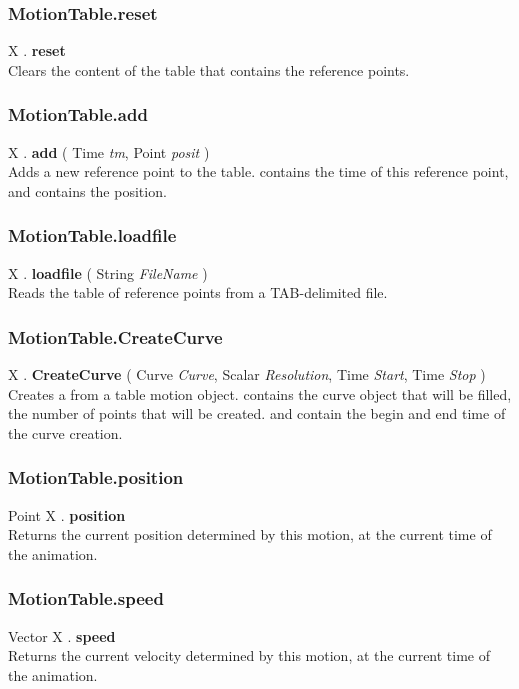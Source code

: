 \subsubsection{MotionTable.reset \label{F:MotionTable:reset}}
X . \textbf{reset} \\
Clears the content of the table that contains the reference points.

\subsubsection{MotionTable.add \label{F:MotionTable:add}}
X . \textbf{add} ( Time \textit{tm}, Point \textit{posit} ) \\
Adds a new reference point to the table.  contains the time of this reference point, and  contains the position.

\subsubsection{MotionTable.loadfile \label{F:MotionTable:loadfile}}
X . \textbf{loadfile} ( String \textit{FileName} ) \\
Reads the table of reference points from a TAB-delimited file.

\subsubsection{MotionTable.CreateCurve \label{F:MotionTable:CreateCurve}}
X . \textbf{CreateCurve} ( Curve \textit{Curve}, Scalar \textit{Resolution}, Time \textit{Start}, Time \textit{Stop} ) \\
Creates a  from a table motion object.  contains the curve object that will be filled,  the number of points that will be created.  and  contain the begin and end time of the curve creation.

\subsubsection{MotionTable.position \label{F:MotionTable:position}}
Point X . \textbf{position} \\
Returns the current position determined by this motion, at the current time of the animation.

\subsubsection{MotionTable.speed \label{F:MotionTable:speed}}
Vector X . \textbf{speed} \\
Returns the current velocity determined by this motion, at the current time of the animation.


